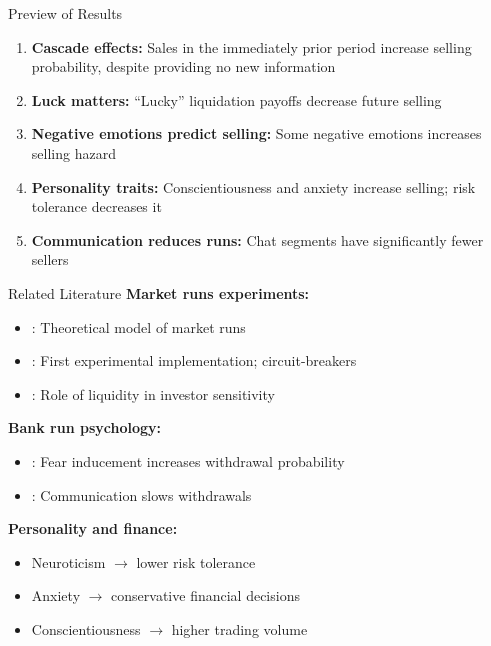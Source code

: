 \documentclass{beamer}
\begin{document}
\begin{frame}{Preview of Results}
\begin{enumerate}
    \item \textbf{Cascade effects:} Sales in the immediately prior period increase selling probability, despite providing no new information
    \item \textbf{Luck matters:} ``Lucky'' liquidation payoffs decrease future selling
    \item \textbf{Negative emotions predict selling:} Some negative emotions increases selling hazard
    \item \textbf{Personality traits:} Conscientiousness and anxiety increase selling; risk tolerance decreases it
    \item \textbf{Communication reduces runs:} Chat segments have significantly fewer sellers
\end{enumerate}
\end{frame}


\begin{frame}{Related Literature}
\textbf{Market runs experiments:}
\begin{itemize}
    \item \cite{bernardo2004liquidity}: Theoretical model of market runs
    \item \cite{magnani2020dynamic}: First experimental implementation; circuit-breakers
    \item \cite{choi2022market}: Role of liquidity in investor sensitivity
\end{itemize}
\vspace{0.3cm}
\textbf{Bank run psychology:}
\begin{itemize}
    \item \cite{dijk2017bank}: Fear inducement increases withdrawal probability
    \item \cite{shakina2018coordination}: Communication slows withdrawals
\end{itemize}
\vspace{0.3cm}
\textbf{Personality and finance:}
\begin{itemize}
    \item Neuroticism $\rightarrow$ lower risk tolerance \citep{rustichini2016toward}
    \item Anxiety $\rightarrow$ conservative financial decisions \citep{gambetti2012effect}
    \item Conscientiousness $\rightarrow$ higher trading volume \citep{bajo2023psychological}
\end{itemize}
\end{frame}
\end{document}
